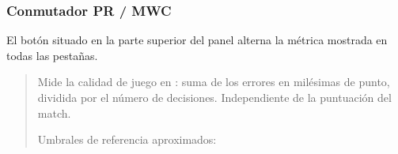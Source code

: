 \documentclass[letterpaper,10pt,spanish]{sphinxmanual}
\begin{document}
\subsubsection{Conmutador PR / MWC}
\label{\detokenize{manuel:toggle-pr-mwc}}
\sphinxAtStartPar
El botón  situado en la parte superior del panel alterna la métrica mostrada en todas las pestañas.

\sphinxAtStartPar
{}
\begin{quote}

\sphinxAtStartPar
Mide la calidad de juego en : suma de los errores en milésimas de punto, dividida por el número de decisiones. Independiente de la puntuación del match.

\sphinxAtStartPar
Umbrales de referencia aproximados:



\end{quote}
\end{document}

